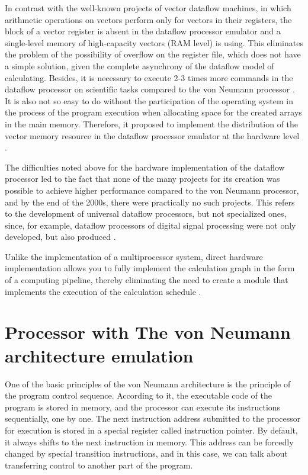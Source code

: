 \documentclass[
11pt,%
tightenlines,%
twoside,%
onecolumn,%
nofloats,%
nobibnotes,%
nofootinbib,%
superscriptaddress,%
noshowpacs,%
centertags]%
{revtex4}
\begin{document}
In contrast with the well-known projects of vector dataflow machines, in which arithmetic operations on vectors perform only for vectors in their registers, the block of a vector register is absent in the dataflow processor emulator and a single-level memory of high-capacity vectors (RAM level) is using.
This eliminates the problem of the possibility of overflow on the register file, which does not have a simple solution, given the complete asynchrony of the dataflow model of calculating.
Besides, it is necessary to execute 2-3 times more commands in the dataflow processor on scientific tasks compared to the von Neumann processor \cite{multithreading}.
It is also not so easy to do without the participation of the operating system in the process of the program execution when allocating space for the created arrays in the main memory.
Therefore, it proposed to implement the distribution of the vector memory resource in the dataflow processor emulator at the hardware level \cite{vpp}.

The difficulties noted above for the hardware implementation of the dataflow processor led to the fact that none of the many projects for its creation was possible to achieve higher performance compared to the von Neumann processor, and by the end of the 2000s, there were practically no such projects.
This refers to the development of universal dataflow processors, but not specialized ones, since, for example, dataflow processors of digital signal processing were not only developed, but also produced \cite{terada}.

Unlike the implementation of a multiprocessor system, direct hardware implementation allows you to fully implement the calculation graph in the form of a computing pipeline, thereby eliminating the need to create a module that implements the execution of the calculation schedule \cite{popov}.

\section{Processor with The von Neumann architecture emulation}

One of the basic principles of the von Neumann architecture is the principle of the program control sequence.
According to it, the executable code of the program is stored in memory, and the processor can execute its instructions sequentially, one by one.
The next instruction address submitted to the processor for execution is stored in a special register called instruction pointer.
By default, it always shifts to the next instruction in memory.
This address can be forcedly changed by special transition instructions, and in this case, we can talk about transferring control to another part of the program.
\end{document}
